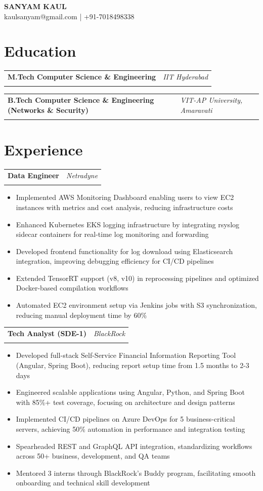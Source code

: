 \documentclass[11pt,a4paper]{article}
\makeatletter
\newcommand{\resumeItem}[1]{\item\small{#1}}
\newcommand{\resumeHeading}[4]{
  \begin{tabular*}{\textwidth}[t]{p{0.65\textwidth}@{\extracolsep{\fill}}>{\raggedleft\arraybackslash}p{0.3\textwidth}}
    \textbf{#1} & \textit{#2} \\
    & \textit{\ifstrempty{#4}{#3}{#3 \ #4}}
  \end{tabular*}
  \vspace{-4pt}
}
\makeatother
\begin{document}
\begin{center}
    {\Huge\bfseries SANYAM KAUL} \\
    \vspace{2pt}
    \small kaulsanyam@gmail.com | +91-7018498338
\end{center}

\section{Education}
\resumeHeading{M.Tech Computer Science \& Engineering}{IIT Hyderabad}{2025}{CGPA: 8.90}
\resumeHeading{B.Tech Computer Science \& Engineering (Networks \& Security)}{VIT-AP University, Amaravati}{2021}{CGPA: 8.90}

\section{Experience}
\resumeHeading{Data Engineer}{Netradyne}{July 2025 - Present}{}
\begin{itemize}[leftmargin=*,noitemsep,topsep=0pt]
    \resumeItem{Implemented AWS Monitoring Dashboard enabling users to view EC2 instances with metrics and cost analysis, reducing infrastructure costs}
    \resumeItem{Enhanced Kubernetes EKS logging infrastructure by integrating rsyslog sidecar containers for real-time log monitoring and forwarding}
    \resumeItem{Developed frontend functionality for log download using Elasticsearch integration, improving debugging efficiency for CI/CD pipelines}
    \resumeItem{Extended TensorRT support (v8, v10) in reprocessing pipelines and optimized Docker-based compilation workflows}
    \resumeItem{Automated EC2 environment setup via Jenkins jobs with S3 synchronization, reducing manual deployment time by 60\%}
\end{itemize}

\resumeHeading{Tech Analyst (SDE-1)}{BlackRock}{July 2021 - June 2023}{}
\begin{itemize}[leftmargin=*,noitemsep,topsep=0pt]
    \resumeItem{Developed full-stack Self-Service Financial Information Reporting Tool (Angular, Spring Boot), reducing report setup time from 1.5 months to 2-3 days}
    \resumeItem{Engineered scalable applications using Angular, Python, and Spring Boot with 85\%+ test coverage, focusing on architecture and design patterns}
    \resumeItem{Implemented CI/CD pipelines on Azure DevOps for 5 business-critical servers, achieving 50\% automation in performance and integration testing}
    \resumeItem{Spearheaded REST and GraphQL API integration, standardizing workflows across 50+ business, development, and QA teams}
    \resumeItem{Mentored 3 interns through BlackRock's Buddy program, facilitating smooth onboarding and technical skill development}
\end{itemize}
\end{document}
